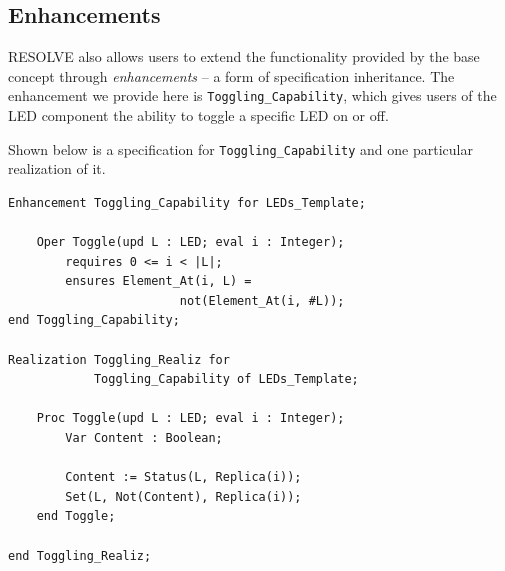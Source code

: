 \documentclass{sig-alternate}
\begin{document}




\subsection{Enhancements}

RESOLVE also allows users to extend the functionality provided by the base concept through \textit{enhancements} -- a form of specification inheritance. The enhancement we provide here is  \texttt{Toggling\_Capability}, which gives users of the LED component the ability to toggle a specific LED on or off. 

Shown below is a specification for \texttt{Toggling\_Capability} and one particular realization of it.

\begin{verbatim}
Enhancement Toggling_Capability for LEDs_Template;

    Oper Toggle(upd L : LED; eval i : Integer);
        requires 0 <= i < |L|;
        ensures Element_At(i, L) = 
                        not(Element_At(i, #L));
end Toggling_Capability;

Realization Toggling_Realiz for
            Toggling_Capability of LEDs_Template;

    Proc Toggle(upd L : LED; eval i : Integer);
        Var Content : Boolean;
        
        Content := Status(L, Replica(i));
        Set(L, Not(Content), Replica(i));
    end Toggle;
    
end Toggling_Realiz;
\end{verbatim}
\end{document}
